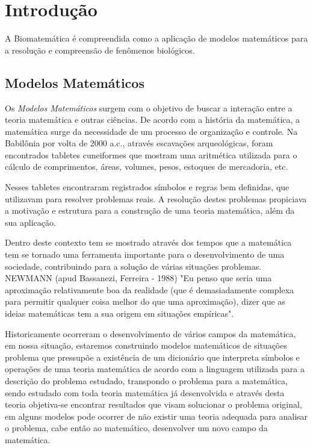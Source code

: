 
\chapter{Introdução}

\begin{definition}[Biomatemática]
A Biomatemática é compreendida como a aplicação de modelos matemáticos para a resolução e compreensão de fenômenos biológicos.
\end{definition}

\section{Modelos Matemáticos}

Os \textit{Modelos Matemáticos} surgem com o objetivo de buscar a interação entre a teoria matemática e outras ciências. De acordo com a história da matemática, a matemática surge da necessidade de um processo de organização e controle. Na Babilônia por volta de 2000 a.c., através escavações arqueológicas, foram encontrados tabletes cuneiformes que mostram uma aritmética utilizada para o cálculo de comprimentos, áreas, volumes, pesos, estoques de mercadoria, etc.

Nesses tabletes encontraram registrados símbolos e regras bem definidas, que utilizavam para resolver problemas reais. A resolução destes problemas propiciava a motivação e estrutura para a construção de uma teoria matemática, além da sua aplicação.

Dentro deste contexto tem se mostrado através dos tempos que a matemática tem se tornado uma ferramenta importante para o desenvolvimento de uma sociedade, contribuindo para a solução de várias situações problemas. NEWMANN (apud Bassanezi, Ferreira - 1988) "Eu penso que seria uma aproximação relativamente boa da realidade (que é demasiadamente complexa para permitir qualquer coisa melhor do que uma aproximação), dizer que as ideias matemáticas tem a sua origem em situações empíricas".

Historicamente ocorreram o desenvolvimento de vários campos da matemática, em nossa situação, estaremos construindo modelos matemáticos de situações problema que pressupõe a existência de um dicionário que interpreta símbolos e operações de uma teoria matemática de acordo com a linguagem utilizada para a descrição do problema estudado, transpondo o problema para a matemática, sendo estudado com toda teoria matemática já desenvolvida e através desta teoria objetiva-se encontrar resultados que visam solucionar o problema original, em alguns modelos pode ocorrer de não existir uma teoria adequada para analisar o problema, cabe então ao matemático, desenvolver um novo campo da matemática.

